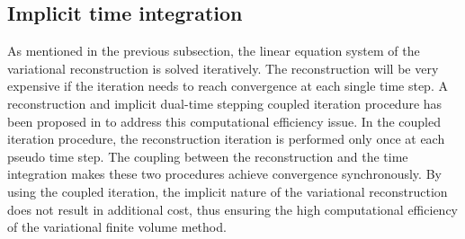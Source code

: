 \subsection{Implicit time integration}
\label{ssec:TimeMarching}

As mentioned in the previous subsection, the linear equation system of the variational reconstruction is solved iteratively. The reconstruction will be very expensive if the iteration needs to reach convergence at each single time step. A reconstruction and implicit dual-time stepping coupled iteration procedure has been proposed in \cite{wang2016compact1_VR} to address this computational efficiency issue. In the coupled iteration procedure, the reconstruction iteration is performed only once at each pseudo time step. The coupling between the reconstruction and the time integration makes these two procedures achieve convergence synchronously. By using the coupled iteration, the implicit nature of the variational reconstruction does not result in additional cost, thus ensuring the high computational efficiency of the variational finite volume method.


